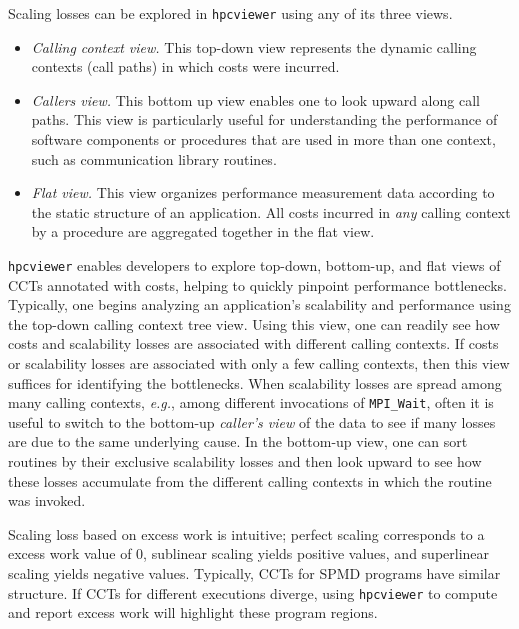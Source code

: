 \documentclass[12pt]{article}
\newcommand{\eg}{\emph{e.g.}}  %
\newcommand{\hpcviewer}{\texttt{hpcviewer}}
\begin{document}
Scaling losses can be explored in {\tt hpcviewer} using any of its three views.

\begin{itemize}
\item {\em Calling context view.} This top-down view represents the dynamic calling contexts (call paths) in which costs were incurred. 
\item {\em Callers view.}  This bottom up view enables one to look upward along call paths. This view is particularly useful for understanding the performance of software components or procedures that are used in more than one context, such as communication library routines.
\item {\em Flat view.} This view organizes performance measurement data according to the static structure of an application. All costs incurred in {\em any} calling context by a procedure are aggregated together in the flat view. 
\end{itemize}

\hpcviewer{} enables developers to explore top-down, bottom-up, and flat views
of  CCTs annotated with costs, helping to quickly pinpoint performance
bottlenecks. Typically, one begins analyzing an application's scalability
and performance using the top-down calling context tree view. Using this
view, one can readily see how costs and scalability losses are associated
with different calling contexts. If costs or scalability losses are
associated with only a few calling contexts, then this view suffices for
identifying the bottlenecks. When scalability losses are spread among many
calling contexts, \eg, among different invocations of {\tt MPI\_Wait},
often it is useful to switch to the bottom-up {\em caller's view} of
the data to see if many losses are due to the same underlying cause. In
the bottom-up view, one can sort routines by their exclusive scalability
losses and then look upward to see how these losses accumulate from the
different calling contexts in which the routine was invoked.

Scaling loss based on excess work is intuitive; perfect scaling
corresponds to a excess work value of $0$, sublinear scaling yields
positive values, and superlinear scaling yields negative values.
Typically, CCTs for SPMD programs have similar structure. If CCTs for
different executions diverge, using {\tt hpcviewer} to compute and report
excess work will highlight these program regions.
\end{document}

